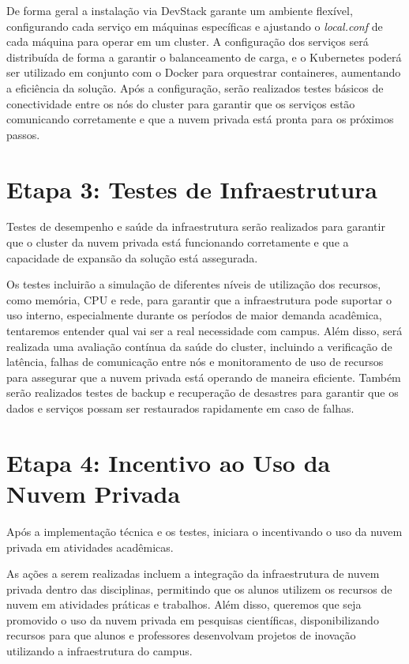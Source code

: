 De forma geral a instalação via DevStack garante um ambiente flexível, configurando cada serviço em máquinas específicas e ajustando o \textit{local.conf} de cada máquina para operar em um cluster. A configuração dos serviços será distribuída de forma a garantir o balanceamento de carga, e o Kubernetes poderá ser utilizado em conjunto com o Docker para orquestrar containeres, aumentando a eficiência da solução. Após a configuração, serão realizados testes básicos de conectividade entre os nós do cluster para garantir que os serviços estão comunicando corretamente e que a nuvem privada está pronta para os próximos passos.

\section{Etapa 3: Testes de Infraestrutura}

Testes de desempenho e saúde da infraestrutura serão realizados para garantir que o cluster da nuvem privada está funcionando corretamente e que a capacidade de expansão da solução está assegurada.

Os testes incluirão a simulação de diferentes níveis de utilização dos recursos, como memória, CPU e rede, para garantir que a infraestrutura pode suportar o uso interno, especialmente durante os períodos de maior demanda acadêmica, tentaremos entender qual vai ser a real necessidade com campus. Além disso, será realizada uma avaliação contínua da saúde do cluster, incluindo a verificação de latência, falhas de comunicação entre nós e monitoramento de uso de recursos para assegurar que a nuvem privada está operando de maneira eficiente. Também serão realizados testes de backup e recuperação de desastres para garantir que os dados e serviços possam ser restaurados rapidamente em caso de falhas.

\section{Etapa 4: Incentivo ao Uso da Nuvem Privada}

Após a implementação técnica e os testes, iniciara o incentivando o uso da nuvem privada em atividades acadêmicas.

As ações a serem realizadas incluem a integração da infraestrutura de nuvem privada dentro das disciplinas, permitindo que os alunos utilizem os recursos de nuvem em atividades práticas e trabalhos. Além disso, queremos que seja promovido o uso da nuvem privada em pesquisas científicas, disponibilizando recursos para que alunos e professores desenvolvam projetos de inovação utilizando a infraestrutura do campus.

